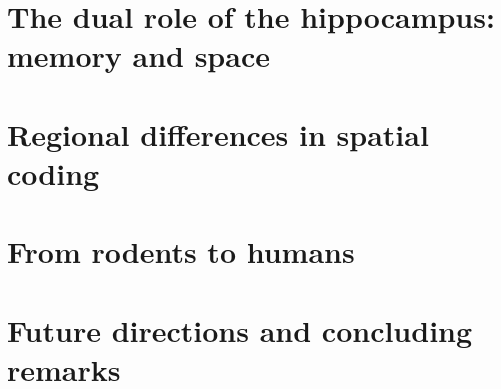 \section{The dual role of the hippocampus: memory and space}

\section{Regional differences in spatial coding}

\section{From rodents to humans}

\section{Future directions and concluding remarks}